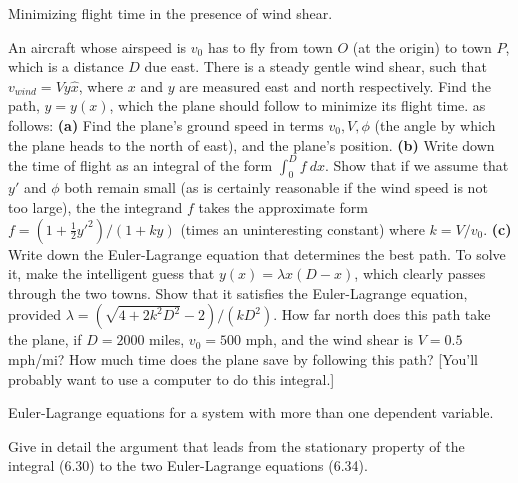 \documentclass[11pt,letterpaper,boxed]{../hmcpset}
\newcommand{\half}{\frac{1}{2}}
\begin{document}
\begin{problem}[vi]
Minimizing flight time in the presence of wind shear.

\begin{problem}[6.23] An aircraft whose airspeed is $v_0$ has to fly from town $O$ (at the origin) to town $P$, which is a distance $D$ due east. There is a steady gentle wind shear, such that $v_{wind} = V y \hat x$, where $x$ and $y$ are measured east and north respectively. Find the path, $y = y(x)$, which the plane should follow to minimize its flight time. as follows: \textbf{(a)} Find the plane's ground speed in terms $v_0, V, \phi$ (the angle by which the plane heads to the north of east), and the plane's position. \textbf{(b)} Write down the time of flight as an integral of the form $\int_0^D f \ dx$. Show that if we assume that $y'$ and $\phi$ both remain small (as is certainly reasonable if the wind speed is not too large), the the integrand $f$ takes the approximate form $f = (1 + \half {y'}^2)/(1 + ky)$ (times an uninteresting constant) where $k = V/v_0$. \textbf{(c)} Write down the Euler-Lagrange equation that determines the best path. To solve it, make the intelligent guess that $y(x) = \lambda x(D-x)$, which clearly passes through the two towns. Show that it satisfies the Euler-Lagrange equation, provided $\lambda = (\sqrt{4 + 2k^2 D^2} -2)/(kD^2)$. How far north does this path take the plane, if $D = 2000$ miles, $v_0 = 500$ mph, and the wind shear is $V = 0.5$ mph/mi? How much time does the plane save by following this path? [You'll probably want to use a computer to do this integral.]
\end{problem}
\end{problem}
\begin{solution}


\vfill
\end{solution}

\newpage

\begin{problem}[vii]
Euler-Lagrange equations for a system with more than one dependent variable.

\begin{problem}[6.26] Give in detail the argument that leads from the stationary property of the integral (6.30) to the two Euler-Lagrange equations (6.34).
\end{problem}
\end{problem}
\begin{solution}


\vfill
\end{solution}
\end{document}

